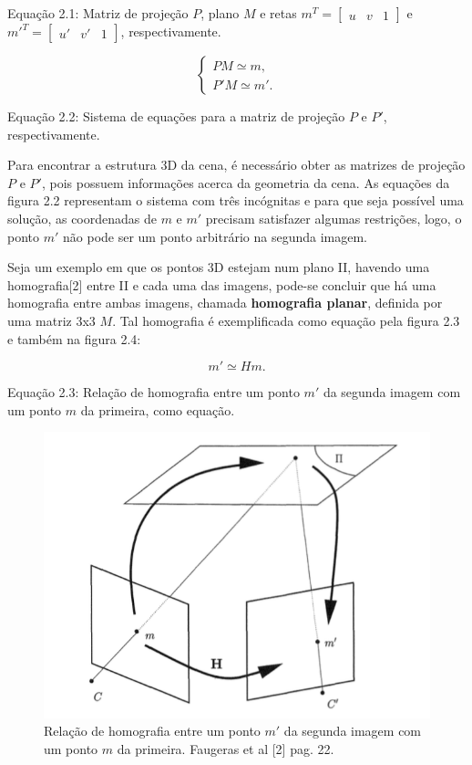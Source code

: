 Equação 2.1: Matriz de projeção $P$, plano $M$ e retas $m^T = \begin{bmatrix}u & v & 1\end{bmatrix}$ e $m'^T = \begin{bmatrix}u' & v' & 1\end{bmatrix}$, respectivamente.

$$
\begin{cases}
P M \simeq m, \\
P' M \simeq m'.
\end{cases}
$$

Equação 2.2: Sistema de equações para a matriz de projeção $P$ e $P'$, respectivamente.

Para encontrar a estrutura 3D da cena, é necessário obter as matrizes de projeção $P$ e $P'$, pois possuem informações acerca da geometria da cena. As equações da figura 2.2 representam o sistema com três incógnitas e para que seja possível uma solução, as coordenadas de $m$ e $m'$ precisam satisfazer algumas restrições, logo, o ponto $m'$ não pode ser um ponto arbitrário na segunda imagem.

Seja um exemplo em que os pontos 3D estejam num plano II, havendo uma homografia[2] entre II e cada uma das imagens, pode-se concluir que há uma homografia entre ambas imagens, chamada \textbf{homografia planar}, definida por uma matriz 3x3 $M$. Tal homografia é exemplificada como equação pela figura 2.3 e também na figura 2.4:

$$
m' \simeq Hm.
$$

Equação 2.3: Relação de homografia entre um ponto $m'$ da segunda imagem com um ponto $m$ da primeira, como equação.

\begin{figure}
	\centering
		\includegraphics{Imagens/figura2-1.png}
	\caption{Relação de homografia entre um ponto $m'$ da segunda imagem com um ponto $m$ da primeira. Faugeras et al [2] pag. 22.}
\end{figure}


